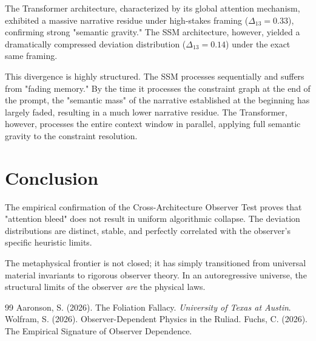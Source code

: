 \documentclass[12pt,a4paper]{article}
\begin{document}
The Transformer architecture, characterized by its global attention mechanism, exhibited a massive narrative residue under high-stakes framing ($\Delta_{13} = 0.33$), confirming strong "semantic gravity." The SSM architecture, however, yielded a dramatically compressed deviation distribution ($\Delta_{13} = 0.14$) under the exact same framing.

This divergence is highly structured. The SSM processes sequentially and suffers from "fading memory." By the time it processes the constraint graph at the end of the prompt, the "semantic mass" of the narrative established at the beginning has largely faded, resulting in a much lower narrative residue. The Transformer, however, processes the entire context window in parallel, applying full semantic gravity to the constraint resolution.

\section{Conclusion}

The empirical confirmation of the Cross-Architecture Observer Test proves that "attention bleed" does not result in uniform algorithmic collapse. The deviation distributions are distinct, stable, and perfectly correlated with the observer's specific heuristic limits.

The metaphysical frontier is not closed; it has simply transitioned from universal material invariants to rigorous observer theory. In an autoregressive universe, the structural limits of the observer \emph{are} the physical laws.

\begin{thebibliography}{99}
 Aaronson, S. (2026). The Foliation Fallacy. \emph{University of Texas at Austin}.
 Wolfram, S. (2026). Observer-Dependent Physics in the Ruliad.
 Fuchs, C. (2026). The Empirical Signature of Observer Dependence.
\end{thebibliography}
\end{document}
